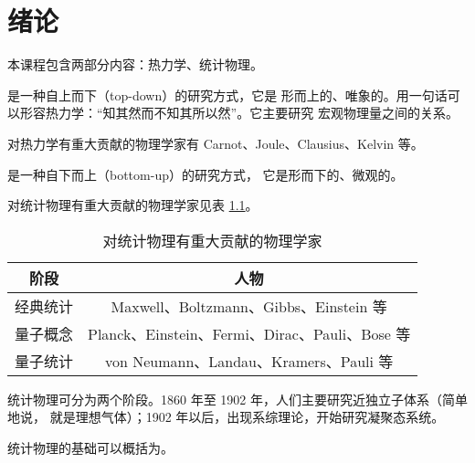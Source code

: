 \chapter{绪论}

本课程包含两部分内容：热力学、统计物理。

是一种自上而下（top-down）的研究方式，它是
形而上的、唯象的。用一句话可以形容热力学：“知其然而不知其所以然”。它主要研究
宏观物理量之间的关系。

对热力学有重大贡献的物理学家有 Carnot、Joule、Clausius、Kelvin 等。

\blankline

是一种自下而上（bottom-up）的研究方式，
它是形而下的、微观的。

对统计物理有重大贡献的物理学家见表 \ref{tab:physicist-in-statistical-physics}。

\begin{table}[h]
  \centering
  \caption{对统计物理有重大贡献的物理学家}
  \label{tab:physicist-in-statistical-physics}
  \begin{tabular}{cc}
    \toprule
      \textbf{阶段} & \textbf{人物} \\
    \midrule
      经典统计 & Maxwell、Boltzmann、Gibbs、Einstein 等 \\
      量子概念 & Planck、Einstein、Fermi、Dirac、Pauli、Bose 等 \\
      量子统计 & von Neumann、Landau、Kramers、Pauli 等 \\
    \bottomrule
  \end{tabular}
\end{table}

统计物理可分为两个阶段。1860 年至 1902 年，人们主要研究近独立子体系（简单地说，
就是理想气体）；1902 年以后，出现系综理论，开始研究凝聚态系统。

统计物理的基础可以概括为。
